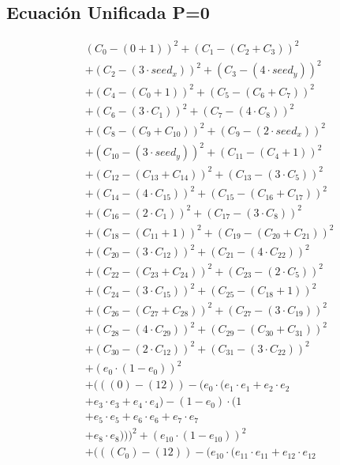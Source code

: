 \documentclass[10pt, a4paper]{article}
\begin{document}
\subsection*{Ecuación Unificada P=0}
\begin{align*}
& (C_{0} - (0 + 1))^{2} + (C_{1} - (C_{2} + C_{3}))^{2} \\
& + (C_{2} - (3  \cdot  seed_x))^{2} + (C_{3} - (4  \cdot  seed_y))^{2} \\
& + (C_{4} - (C_{0} + 1))^{2} + (C_{5} - (C_{6} + C_{7}))^{2} \\
& + (C_{6} - (3  \cdot  C_{1}))^{2} + (C_{7} - (4  \cdot  C_{8}))^{2} \\
& + (C_{8} - (C_{9} + C_{10}))^{2} + (C_{9} - (2  \cdot  seed_x))^{2} \\
& + (C_{10} - (3  \cdot  seed_y))^{2} + (C_{11} - (C_{4} + 1))^{2} \\
& + (C_{12} - (C_{13} + C_{14}))^{2} + (C_{13} - (3  \cdot  C_{5}))^{2} \\
& + (C_{14} - (4  \cdot  C_{15}))^{2} + (C_{15} - (C_{16} + C_{17}))^{2} \\
& + (C_{16} - (2  \cdot  C_{1}))^{2} + (C_{17} - (3  \cdot  C_{8}))^{2} \\
& + (C_{18} - (C_{11} + 1))^{2} + (C_{19} - (C_{20} + C_{21}))^{2} \\
& + (C_{20} - (3  \cdot  C_{12}))^{2} + (C_{21} - (4  \cdot  C_{22}))^{2} \\
& + (C_{22} - (C_{23} + C_{24}))^{2} + (C_{23} - (2  \cdot  C_{5}))^{2} \\
& + (C_{24} - (3  \cdot  C_{15}))^{2} + (C_{25} - (C_{18} + 1))^{2} \\
& + (C_{26} - (C_{27} + C_{28}))^{2} + (C_{27} - (3  \cdot  C_{19}))^{2} \\
& + (C_{28} - (4  \cdot  C_{29}))^{2} + (C_{29} - (C_{30} + C_{31}))^{2} \\
& + (C_{30} - (2  \cdot  C_{12}))^{2} + (C_{31} - (3  \cdot  C_{22}))^{2} \\
& + (e_{0} \cdot (1 - e_{0}))^{2} \\
& + (((0) - (12)) - (e_{0} \cdot (e_{1} \cdot e_{1} + e_{2} \cdot e_{2} \\
& + e_{3} \cdot e_{3} + e_{4} \cdot e_{4}) - (1 - e_{0}) \cdot (1 \\
& + e_{5} \cdot e_{5} + e_{6} \cdot e_{6} + e_{7} \cdot e_{7} \\
& + e_{8} \cdot e_{8})))^{2} + (e_{10} \cdot (1 - e_{10}))^{2} \\
& + (((C_{0}) - (12)) - (e_{10} \cdot (e_{11} \cdot e_{11} + e_{12} \cdot e_{12} \\

\end{align*}
\end{document}
